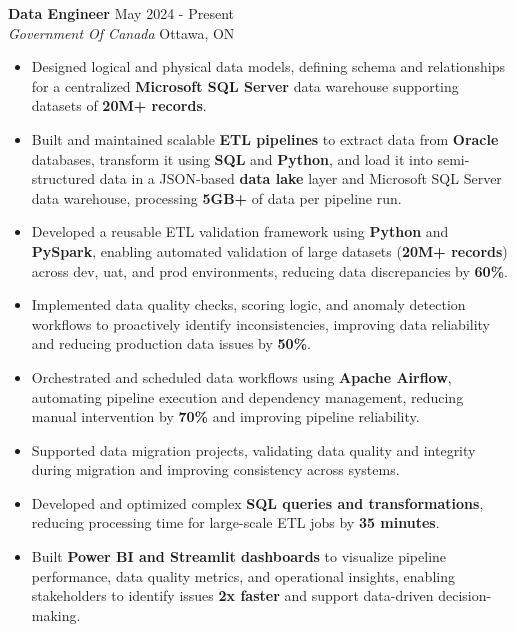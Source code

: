 \documentclass[a4paper]{article}
\begin{document}
\textbf{Data Engineer} \hfill May 2024 - Present\\
\textit{Government Of Canada} \hfill Ottawa, ON\\
\vspace{-2mm}
\begin{itemize} \itemsep -4pt

\item Designed logical and physical data models, defining schema and relationships for a centralized \textbf{Microsoft SQL Server} data warehouse supporting datasets of \textbf{20M+ records}.

\item Built and maintained scalable \textbf{ETL pipelines} to extract data from \textbf{Oracle} databases, transform it using \textbf{SQL} and \textbf{Python}, and load it into semi-structured data in a JSON-based \textbf{data lake} layer and Microsoft SQL Server data warehouse, processing \textbf{5GB+} of data per pipeline run.

\item Developed a reusable ETL validation framework using \textbf{Python} and \textbf{PySpark}, enabling automated validation of large datasets (\textbf{20M+ records}) across dev, uat, and prod environments, reducing data discrepancies by \textbf{60\%}.

\item Implemented data quality checks, scoring logic, and anomaly detection workflows to proactively identify inconsistencies, improving data reliability and reducing production data issues by \textbf{50\%}.

\item Orchestrated and scheduled data workflows using \textbf{Apache Airflow}, automating pipeline execution and dependency management, reducing manual intervention by \textbf{70\%} and improving pipeline reliability.

\item Supported data migration projects, validating data quality and integrity during migration and improving consistency across systems.

\item Developed and optimized complex \textbf{SQL queries and transformations}, reducing processing time for large-scale ETL jobs by \textbf{35 minutes}.

\item Built \textbf{Power BI and Streamlit dashboards} to visualize pipeline performance, data quality metrics, and operational insights, enabling stakeholders to identify issues \textbf{2x faster} and support data-driven decision-making.


\end{itemize}
\end{document}
